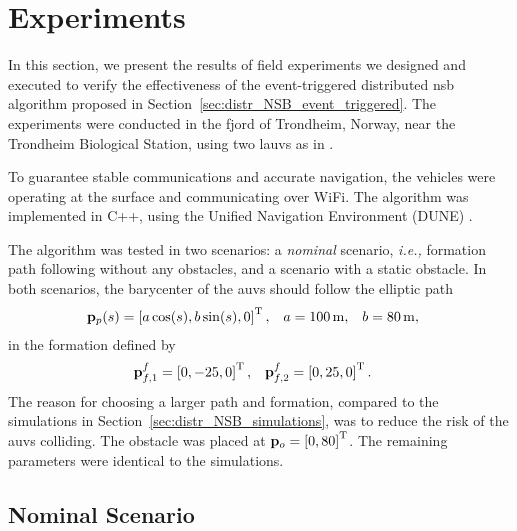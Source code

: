 

\section{Experiments}
\label{sec:distr_NSB_experiments}



In this section, we present the results of field experiments we designed and executed to verify the effectiveness of the event-triggered distributed \gls{nsb} algorithm proposed in Section~\ref{sec:distr_NSB_event_triggered}.
The experiments were conducted in the fjord of Trondheim, Norway, near the Trondheim Biological Station, using two \glspl{lauv} as in .

To guarantee stable communications and accurate navigation, the vehicles were operating at the surface and communicating over WiFi.
The algorithm was implemented in C++, using the Unified Navigation Environment (DUNE) \cite{dune}.

The algorithm was tested in two scenarios: a \emph{nominal} scenario, \emph{i.e.,} formation path following without any obstacles, and a scenario with a static obstacle.
In both scenarios, the barycenter of the \glspl{auv} should follow the elliptic path
\begin{align}
    \mathbf{p}_p(s) &= \left[a \cos(s), b \sin(s), 0\right]^{\mathrm{T}},& 
    a &= \SI{100}{\meter},& 
    b &= \SI{80}{\meter},
\end{align}
in the formation defined by
\begin{align}
    \mathbf{p}_{f, 1}^f &= \left[0, -25, 0\right]^{\mathrm{T}}, &
    \mathbf{p}_{f, 2}^f &= \left[0, 25, 0\right]^{\mathrm{T}}.
\end{align}
The reason for choosing a larger path and formation, compared to the simulations in Section~\ref{sec:distr_NSB_simulations}, was to reduce the risk of the \glspl{auv} colliding.
The obstacle was placed at $\mathbf{p}_o = \left[0, 80\right]^{\mathrm{T}}$.
The remaining parameters were identical to the simulations.

\subsection{Nominal Scenario}

